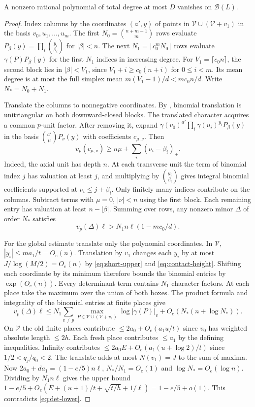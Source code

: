 \begin{proposition}\label{prop:vanish}
A nonzero rational polynomial of total degree at most $D$ vanishes on $\mathcal B(L)$.
\end{proposition}
\begin{proof}
Index columns by the coordinates $(a',y)$ of points in $\mathcal V\cup(\mathcal V+v_1)$
in the basis $v_0,u_1,\ldots,u_m$.
The first $N_0=\binom{n+m-1}{m}$ rows evaluate
$P_\beta(y)=\prod_i\binom{y_i}{\beta_i}$ for $|\beta|<n$.
The next $N_1=\lfloor c_0^mN_0\rfloor$ rows evaluate $\gamma(P)P_\beta(y)$
for the first $N_1$ indices in increasing degree.
For $V_1=\lceil c_0n\rceil$, the second block lies in $|\beta|<V_1$,
since $V_1+i\ge c_0(n+i)$ for $0\le i<m$.
Its mean degree is at most the full simplex mean $m(V_1-1)/d<mc_0n/d$.
Write $N_*=N_0+N_1$.

Translate the columns to nonnegative coordinates. By
\cite[proof of Proposition~7.1, valuation argument]{Z29},
binomial translation is unitriangular on both downward-closed blocks.
The translated character acquires a common $p$-unit factor.
After removing it, expand $\gamma(v_0)^{a'}\prod_i\gamma(u_i)^{y_i}P_\beta(y)$
in the basis $\binom{a'}{\mu}P_\nu(y)$ with coefficients $c_{\mu,\nu}$. Then
\[
 v_p(c_{\mu,\nu})\ge n\mu+\sum_i(\nu_i-\beta_i)_+ .
\]
Indeed, the axial unit has depth $n$. At each transverse unit the term of
binomial index $j$ has valuation at least $j$, and multiplying by
$\binom{y_i}{\beta_i}$ gives integral binomial coefficients supported at
$\nu_i\le j+\beta_i$. Only finitely many indices contribute on the columns.
Subtract terms with $\mu=0$, $|\nu|<n$ using the first block.
Each remaining entry has valuation at least $n-|\beta|$.
Summing over rows, any nonzero minor $\Delta$ of order $N_*$ satisfies
\begin{equation}\label{eq:det-lower}
 v_p(\Delta)\ell>N_1n\ell(1-mc_0/d).
\end{equation}

For the global estimate translate only the polynomial coordinates.
In $\mathcal V$, $|y_i|\le ma_1/t=O_e(n)$.
Translation by $v_1$ changes each $y_i$ by at most $J/\log(M/2)=O_e(n)$
by \eqref{eq:short-upper} and \eqref{eq:contact-height}.
Shifting each coordinate by its minimum therefore bounds the binomial entries by $\exp(O_e(n))$.
Every determinant term contains $N_1$ character factors. At each place take
the maximum over the union of both boxes.
The product formula and integrality of the binomial entries at finite places give
\[
 v_p(\Delta)\ell
 \le N_1\sum_{v\ne p}\max_{P\in\mathcal V\cup(\mathcal V+v_1)}
      \log|\gamma(P)|_v+O_e(N_*(n+\log N_*)).
\]
On $\mathcal V$ the old finite places contribute $\le2a_0+O_e(a_1u/t)$
since $v_0$ has weighted absolute length $\le2h$.
Each fresh place contributes $\le a_1$ by the defining inequalities.
Infinity contributes $\le2a_0E+O_e(a_1(u+\log2)/t)$ since $1/2<q_j/q_0<2$.
The translate adds at most $N(v_1)=J$ to the sum of maxima.
Now $2a_0+da_1=(1-e/5)n\ell$, $N_*/N_1=O_e(1)$ and $\log N_*=O_e(\log n)$.
Dividing by $N_1n\ell$ gives the upper bound
$1-e/5+O_e(E+(u+1)/t+\sqrt{t/h}+1/\ell)=1-e/5+o(1)$.
This contradicts \eqref{eq:det-lower}.


\end{proof}
